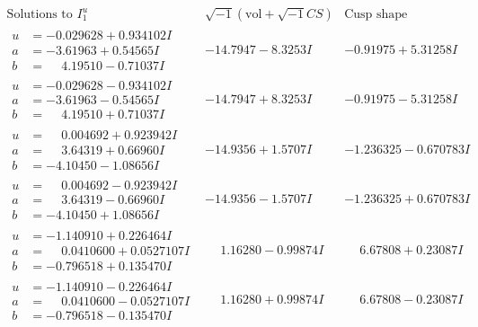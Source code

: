 \documentclass[1p]{elsarticle_modified}
\theoremstyle{definition}
\newcommand{\I}{\sqrt{-1}}
\begin{document}
$$\begin{array}{c|c|c}  
\text{Solutions to }I^u_{1}& \I (\text{vol} + \sqrt{-1}CS) & \text{Cusp shape}\\
 \hline 
\begin{aligned}
u &= -0.029628 + 0.934102 I \\
a &= -3.61963 + 0.54565 I \\
b &= \phantom{-}4.19510 - 0.71037 I\end{aligned}
 & -14.7947 - 8.3253 I & -0.91975 + 5.31258 I \\ \hline\begin{aligned}
u &= -0.029628 - 0.934102 I \\
a &= -3.61963 - 0.54565 I \\
b &= \phantom{-}4.19510 + 0.71037 I\end{aligned}
 & -14.7947 + 8.3253 I & -0.91975 - 5.31258 I \\ \hline\begin{aligned}
u &= \phantom{-}0.004692 + 0.923942 I \\
a &= \phantom{-}3.64319 + 0.66960 I \\
b &= -4.10450 - 1.08656 I\end{aligned}
 & -14.9356 + 1.5707 I & -1.236325 - 0.670783 I \\ \hline\begin{aligned}
u &= \phantom{-}0.004692 - 0.923942 I \\
a &= \phantom{-}3.64319 - 0.66960 I \\
b &= -4.10450 + 1.08656 I\end{aligned}
 & -14.9356 - 1.5707 I & -1.236325 + 0.670783 I \\ \hline\begin{aligned}
u &= -1.140910 + 0.226464 I \\
a &= \phantom{-}0.0410600 + 0.0527107 I \\
b &= -0.796518 + 0.135470 I\end{aligned}
 & \phantom{-}1.16280 - 0.99874 I & \phantom{-}6.67808 + 0.23087 I \\ \hline\begin{aligned}
u &= -1.140910 - 0.226464 I \\
a &= \phantom{-}0.0410600 - 0.0527107 I \\
b &= -0.796518 - 0.135470 I\end{aligned}
 & \phantom{-}1.16280 + 0.99874 I & \phantom{-}6.67808 - 0.23087 I \\ \hline\begin{aligned}

\end{aligned}
\end{array}$$
\end{document}
